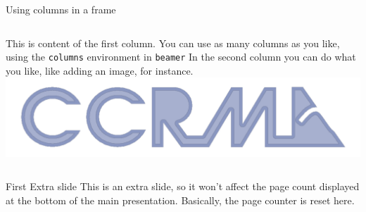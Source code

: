 \documentclass{beamer}
\begin{document}
\begin{frame}{Using columns in a frame}
    \begin{columns}[t]
            This is content of the first column. You can use as many columns as you like, using the \texttt{columns} environment in \texttt{beamer}
            In the second column you can do what you like, like adding an image, for instance.
            \includegraphics[width=\textwidth]{ccrma-logo.pdf}
    \end{columns}
\end{frame}



\appendix  %

\begin{frame}{First Extra slide}
This is an extra slide, so it won't affect the page count displayed at the bottom of the main presentation. Basically, the page counter is reset here.
\end{frame}
\end{document}
